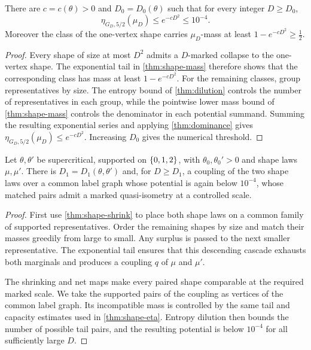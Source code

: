 \begin{lemma}
\label{thm:shape-eta}
\leanok
{}
There are $c=c(\theta)>0$ and $D_0=D_0(\theta)$ such that for every integer $D\geq D_0$,
\[
 \eta_{G_D,5/2}(\mu_D)\leq e^{-cD^{2}}\leq10^{-4}.
\]
Moreover the class of the one-vertex shape carries $\mu_D$-mass at least
$1-e^{-cD^{2}}\geq\tfrac12$.
\end{lemma}

\begin{proof}
\leanok
{}
Every shape of size at most $D^2$ admits a $D$-marked collapse to the one-vertex shape. The
exponential tail in \cref{thm:shape-mass} therefore shows that the corresponding class has mass
at least $1-e^{-cD^2}$. For the remaining classes, group representatives by size. The entropy
bound of \cref{thm:dilution} controls the number of representatives in each group, while the
pointwise lower mass bound of \cref{thm:shape-mass} controls the denominator in each potential
summand. Summing the resulting exponential series and applying \cref{thm:dominance} gives
$\eta_{G_D,5/2}(\mu_D)\leq e^{-cD^2}$. Increasing $D_0$ gives the numerical threshold.
\end{proof}

\begin{lemma}
\label{thm:shape-coupling}
\leanok
Let $\theta,\theta'$ be supercritical, supported on $\{0,1,2\}$, with $\theta_0,\theta_0'>0$
and shape laws $\mu,\mu'$. There is $D_1=D_1(\theta,\theta')$ and, for $D\geq D_1$, a coupling
of the two shape laws over a common label graph whose potential is again below $10^{-4}$, whose
matched pairs admit a marked quasi-isometry at a controlled scale.
\end{lemma}

\begin{proof}
\leanok
{}
First use \cref{thm:shape-shrink} to place both shape laws on a common family of supported
representatives. Order the remaining shapes by size and match their masses greedily from large
to small. Any surplus is passed to the next smaller representative. The exponential tail ensures
that this descending cascade exhausts both marginals and produces a coupling $q$ of $\mu$ and
$\mu'$.

The shrinking and net maps make every paired shape comparable at the required marked scale. We
take the supported pairs of the coupling as vertices of the common label graph. Its incompatible
mass is controlled by the same tail and capacity estimates used in \cref{thm:shape-eta}. Entropy
dilution then bounds the number of possible tail pairs, and the resulting potential is below
$10^{-4}$ for all sufficiently large $D$.
\end{proof}


